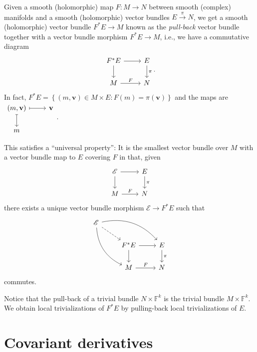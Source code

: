 \begin{definition}
  Given a smooth (holomorphic) map $F:M\to N$ between smooth (complex) manifolds and a smooth (holomorphic) vector bundles $E\overset{\pi}{\to}N$, we get a smooth (holomorphic) vector bundle $F^{*}E\to M$ known as the \textit{pull-back} vector bundle together with a vector bundle morphism $F^{*}E\to M$, i.e., we have a commutative diagram 
  \[
  \begin{tikzcd}
    F^{*}E\arrow[r] \arrow[d] &E\arrow[d,"\pi"]\\
    M \arrow[r,"F"]& N
  \end{tikzcd}.
\]
In fact, $F^{*}E=\left\{(m,\mathbf{v})\in M\times E:F(m)=\pi(\mathbf{v})\right\} $ and the maps are $
  \begin{tikzcd}
    (m,\mathbf{v})\arrow[d,mapsto] \arrow[r,mapsto]&\mathbf{v}\\
    m &
  \end{tikzcd}$.
\end{definition}

This satisfies a ``universal property'': It is the smallest vector bundle over $M$ with a vector bundle map to $E$ covering $F$ in that, given
 \[
\begin{tikzcd}
  \mathscr{E}\arrow[r] \arrow[d] &E\arrow[d,"\pi"] \\
  M\arrow[r,"F"] &N
\end{tikzcd}
\] 
there exists a unique vector bundle morphism $\mathscr{E}\to F^{*}E$ such that 
\[
\begin{tikzcd}
  \mathscr{E}\arrow[rdd, bend right]\arrow[rd, dashed]  \arrow[rrd, bend left] & &\\
   & F^{*}E \arrow[r]\arrow[d]  &E\arrow[d,"\pi"] \\
   & M\arrow[r,"F"]&N 
\end{tikzcd}
\] 
commutes.

Notice that the pull-back of a trivial bundle $N\times \mathbb{F}^{k}$ is the trivial bundle $M\times \mathbb{F}^{k}$. We obtain local trivializations of $F^{*}E$ by pulling-back local trivializations of $E$.

\section{Covariant derivatives}
